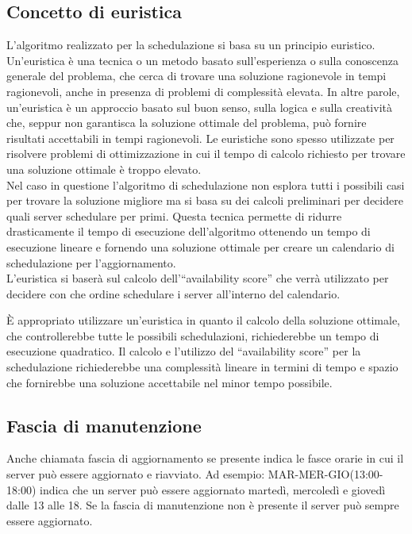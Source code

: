 \subsection{Concetto di euristica}
L’algoritmo realizzato per la schedulazione si basa su un principio euristico. 
Un'euristica è una tecnica o un metodo basato sull'esperienza o sulla 
conoscenza generale del problema, che cerca di trovare una soluzione 
ragionevole in tempi ragionevoli, anche in presenza di problemi di 
complessità elevata. In altre parole, un'euristica è un approccio basato 
sul buon senso, sulla logica e sulla creatività che, seppur non garantisca la 
soluzione ottimale del problema, può fornire risultati accettabili in tempi 
ragionevoli. Le euristiche sono spesso utilizzate per risolvere problemi di 
ottimizzazione in cui il tempo di calcolo richiesto per trovare una soluzione 
ottimale è troppo elevato. ~\cite{wiki:euristica}\\

Nel caso in questione l’algoritmo di schedulazione non esplora tutti i possibili 
casi per trovare la soluzione migliore ma si basa su dei calcoli preliminari 
per decidere quali server schedulare per primi.
Questa tecnica permette di ridurre drasticamente il tempo di esecuzione 
dell’algoritmo ottenendo un tempo di esecuzione lineare e fornendo una 
soluzione ottimale per creare un calendario di schedulazione per l’aggiornamento.\\

L’euristica si baserà sul calcolo dell’“availability score” che verrà utilizzato 
per decidere con che ordine schedulare i server all’interno del calendario.

È appropriato utilizzare un’euristica in quanto il calcolo della soluzione 
ottimale, che controllerebbe tutte le possibili schedulazioni, richiederebbe un 
tempo di esecuzione quadratico. Il calcolo e l’utilizzo del “availability score” 
per la schedulazione richiederebbe una complessità lineare in termini di tempo e 
spazio che fornirebbe una soluzione accettabile nel minor tempo possibile.


\subsection{Fascia di manutenzione}
Anche chiamata fascia di aggiornamento se presente indica le fasce orarie 
in cui il server può essere aggiornato e riavviato. 
Ad esempio: MAR-MER-GIO(13:00-18:00) indica che un server può essere 
aggiornato martedì, mercoledì e giovedì dalle 13 alle 18.
Se la fascia di manutenzione non è presente il server può sempre essere aggiornato.

